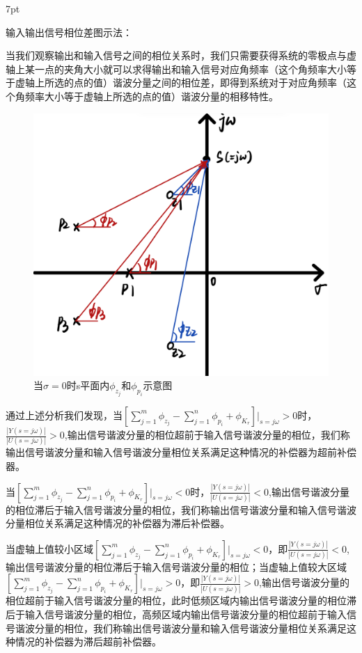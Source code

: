 \documentclass{article}
\numberwithin{equation}{section}
\numberwithin{figure}{section}
\newenvironment{formal}{%
\def\FrameCommand{%
\hspace{1pt}%
{\color{DarkBlue}\vrule width 2pt}%
{\color{formalshade}\vrule width 4pt}%
\colorbox{formalshade}%
}%
\MakeFramed{\advance\hsize-\width\FrameRestore}%
\noindent\hspace{-4.55pt}%
\begin{adjustwidth}{}{7pt}%
\vspace{2pt}\vspace{2pt}%
}
{%
\vspace{2pt}\end{adjustwidth}\endMakeFramed%
}
\begin{document}
\begin{formal}
    输入输出信号相位差图示法：
\end{formal}

当我们观察输出和输入信号之间的相位关系时，我们只需要获得系统的零极点与虚轴上某一点的夹角大小就可以求得输出和输入信号对应角频率（这个角频率大小等于虚轴上所选的点的值）谐波分量之间的相位差，即得到系统对于对应角频率（这个角频率大小等于虚轴上所选的点的值）谐波分量的相移特性。

\begin{figure}
    \centering
    \includegraphics[width=.4\textwidth]{Chapter6/angleofziandpj（σ=0）.jpg} %
    \caption{当$\sigma=0$时s平面内$\phi_{z_j}$和$\phi_{p_i}$示意图} %
    \label{angleofziandpj（σ=0）} %
\end{figure}

通过上述分析我们发现，当$[\sum_{j=1}^{m}\phi_{z_j}-\sum_{j=1}^{n}\phi_{p_i}+\phi_{K_r}]|_{s=j\omega}>0$时，$\frac{|Y(s=j\omega)|}{|U(s=j\omega)|}>0$,输出信号谐波分量的相位超前于输入信号谐波分量的相位，我们称输出信号谐波分量和输入信号谐波分量相位关系满足这种情况的补偿器为超前补偿器。

当$[\sum_{j=1}^{m}\phi_{z_j}-\sum_{j=1}^{n}\phi_{p_i}+\phi_{K_r}]|_{s=j\omega}<0$时，$\frac{|Y(s=j\omega)|}{|U(s=j\omega)|}<0$,输出信号谐波分量的相位滞后于输入信号谐波分量的相位，我们称输出信号谐波分量和输入信号谐波分量相位关系满足这种情况的补偿器为滞后补偿器。

当虚轴上值较小区域$[\sum_{j=1}^{m}\phi_{z_j}-\sum_{j=1}^{n}\phi_{p_i}+\phi_{K_r}]|_{s=j\omega}<0$，即$\frac{|Y(s=j\omega)|}{|U(s=j\omega)|}<0$,输出信号谐波分量的相位滞后于输入信号谐波分量的相位；当虚轴上值较大区域$[\sum_{j=1}^{m}\phi_{z_j}-\sum_{j=1}^{n}\phi_{p_i}+\phi_{K_r}]|_{s=j\omega}>0$，即$\frac{|Y(s=j\omega)|}{|U(s=j\omega)|}>0$,输出信号谐波分量的相位超前于输入信号谐波分量的相位，此时低频区域内输出信号谐波分量的相位滞后于输入信号谐波分量的相位，高频区域内输出信号谐波分量的相位超前于输入信号谐波分量的相位，我们称输出信号谐波分量和输入信号谐波分量相位关系满足这种情况的补偿器为滞后超前补偿器。
\end{document}
